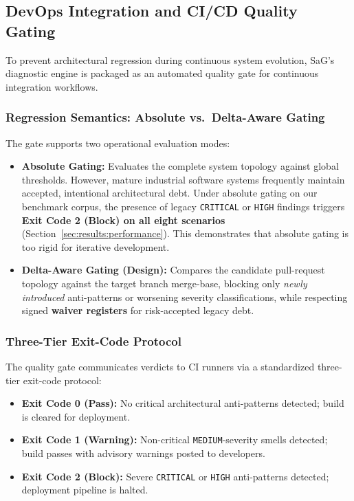 \subsection{DevOps Integration and CI/CD Quality Gating}
\label{sec:cicd_gating}

To prevent architectural regression during continuous system evolution, SaG's diagnostic engine is packaged as an automated quality gate for continuous integration workflows.

\subsubsection{Regression Semantics: Absolute vs.\ Delta-Aware Gating}
\label{sec:cicd:semantics}

The gate supports two operational evaluation modes:
\begin{itemize}
    \item \textbf{Absolute Gating:} Evaluates the complete system topology against global thresholds. However, mature industrial software systems frequently maintain accepted, intentional architectural debt. Under absolute gating on our benchmark corpus, the presence of legacy \texttt{CRITICAL} or \texttt{HIGH} findings triggers \textbf{Exit Code 2 (Block) on all eight scenarios} (Section~\ref{sec:results:performance}). This demonstrates that absolute gating is too rigid for iterative development.
    \item \textbf{Delta-Aware Gating (Design):} Compares the candidate pull-request topology against the target branch merge-base, blocking only \emph{newly introduced} anti-patterns or worsening severity classifications, while respecting signed \textbf{waiver registers} for risk-accepted legacy debt.
\end{itemize}

\subsubsection{Three-Tier Exit-Code Protocol}
\label{sec:cicd:protocol}

The quality gate communicates verdicts to CI runners via a standardized three-tier exit-code protocol:
\begin{itemize}
    \item \textbf{Exit Code 0 (Pass):} No critical architectural anti-patterns detected; build is cleared for deployment.
    \item \textbf{Exit Code 1 (Warning):} Non-critical \texttt{MEDIUM}-severity smells detected; build passes with advisory warnings posted to developers.
    \item \textbf{Exit Code 2 (Block):} Severe \texttt{CRITICAL} or \texttt{HIGH} anti-patterns detected; deployment pipeline is halted.
\end{itemize}

